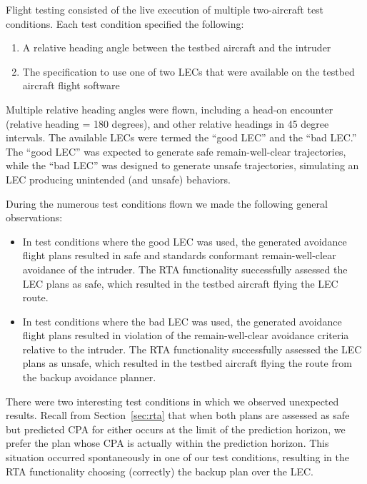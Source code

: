 Flight testing consisted of the live execution of multiple two-aircraft test conditions.  Each test condition specified the following:
\begin{enumerate}
\item A relative heading angle between the testbed aircraft and the intruder
\item The specification to use one of two LECs that were available on the testbed aircraft flight software
\end{enumerate}

Multiple relative heading angles were flown, including a head-on encounter (relative heading = 180 degrees), and other relative headings in 45 degree intervals.
The available LECs were termed the ``good LEC'' and the ``bad LEC.''  The ``good LEC'' was expected to generate safe remain-well-clear trajectories, while the ``bad LEC'' was designed to generate unsafe trajectories, simulating an LEC producing unintended (and unsafe) behaviors.  

During the numerous test conditions flown we made the following general observations:
\begin{itemize}
\item In test conditions where the good LEC was used, the generated avoidance flight plans resulted in safe and standards conformant remain-well-clear avoidance of the intruder.  The RTA functionality successfully assessed the LEC plans as safe, which resulted in the testbed aircraft flying the LEC route.  
\item In test conditions where the bad LEC was used, the generated avoidance flight plans resulted in violation of the remain-well-clear avoidance criteria relative to the intruder.  The RTA functionality successfully assessed the LEC plans as unsafe, which resulted in the testbed aircraft flying the route from the backup avoidance planner.  
\end{itemize}


There were two interesting test conditions in which we observed unexpected results.  Recall from Section~\ref{sec:rta} that when both plans are assessed as safe but predicted CPA for either occurs at the limit of the prediction horizon, we prefer the plan whose CPA is actually within the prediction horizon.  This situation occurred spontaneously in one of our test conditions, resulting in the RTA functionality choosing (correctly) the backup plan over the LEC.  

